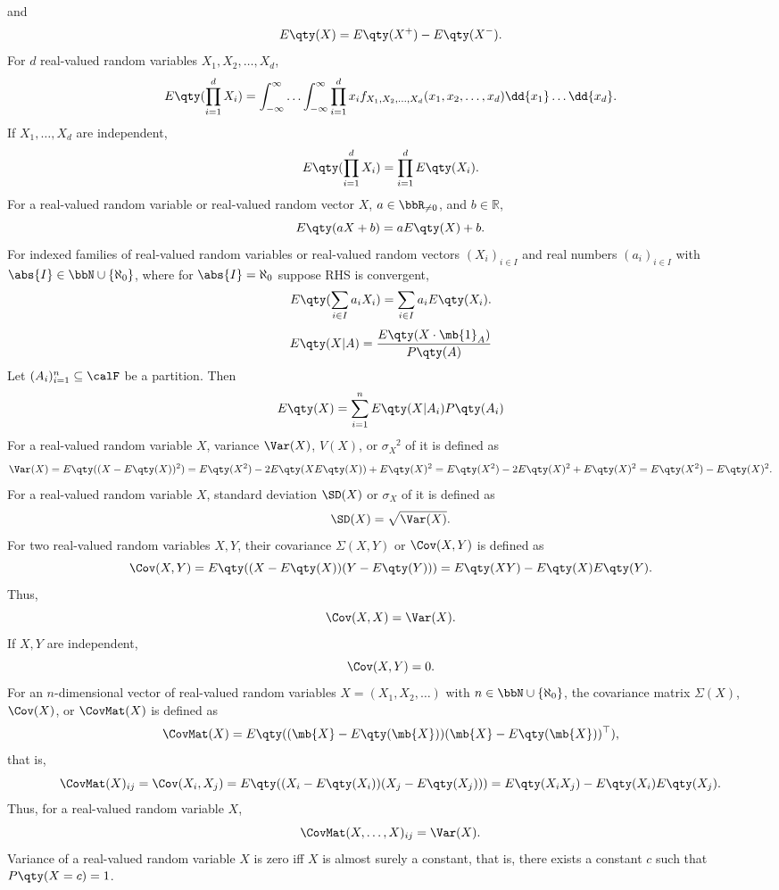\documentclass[a4paper,12pt]{report}
\begin{document}
\epr
and
\[E\qty(X)=E\qty(X^+)-E\qty(X^-).\]
For $d$ real-valued random variables $X_1,X_2,\ldots,X_d$,
\[E\qty(\prod_{i=1}^dX_i)=\int_{-\infty}^{\infty}\ldots\int_{-\infty}^{\infty}\prod_{i=1}^dx_if_{X_1,X_2,\ldots,X_d}(x_1,x_2,\ldots,x_d)\dd{x_1}\ldots\dd{x_d}.\]
If $X_1,\ldots,X_d$ are independent,
\[E\qty(\prod_{i=1}^dX_i)=\prod_{i=1}^dE\qty(X_i).\]
For a real-valued random variable or real-valued random vector $X$, $a\in\bbR_{\neq0}$, and $b\in\mathbb{R}$,
\[E\qty(aX+b)=aE\qty(X)+b.\]
For indexed families of real-valued random variables or real-valued random vectors $(X_i)_{i\in I}$ and real numbers $(a_i)_{i\in I}$ with $\abs{I}\in\bbN\cup\{\aleph_0\}$, where for $\abs{I}=\aleph_0$ suppose RHS is convergent,
\[E\qty(\sum_{i\in I}a_iX_i)=\sum_{i\in I}a_iE\qty(X_i).\]
\[E\qty(X|A)=\frac{E\qty(X\cdot\mb{1}_A)}{P\qty(A)}\]
Let $(A_i)_{i=1}^n\subseteq\calF$ be a partition. Then
\[E\qty(X)=\sum_{i=1}^nE\qty(X|A_i)P\qty(A_i)\]
For a real-valued random variable $X$, variance $\Var(X)$, $V(X)$, or $\sigma_X^{\phantom{X}2}$ of it is defined as
\[\Var(X)=E\qty((X-E\qty(X))^2)=E\qty(X^2)-2E\qty(XE\qty(X))+E\qty(X)^2=E\qty(X^2)-2E\qty(X)^2+E\qty(X)^2=E\qty(X^2)-E\qty(X)^2.\]
For a real-valued random variable $X$, standard deviation $\SD(X)$ or $\sigma_X$ of it is defined as
\[\SD(X)=\sqrt{\Var(X)}.\]
For two real-valued random variables $X,Y$, their covariance $\Sigma(X,Y)$ or $\Cov(X,Y)$ is defined as
\[\Cov(X,Y)=E\qty((X-E\qty(X))(Y-E\qty(Y)))=E\qty(XY)-E\qty(X)E\qty(Y).\]
Thus,
\[\Cov(X,X)=\Var(X).\]
If $X,Y$ are independent,
\[\Cov(X,Y)=0.\]
For an $n$-dimensional vector of real-valued random variables $X=(X_1,X_2,\ldots)$ with $n\in\bbN\cup\{\aleph_0\}$, the covariance matrix $\Sigma(X)$, $\Cov(X)$, or $\CovMat(X)$ is defined as
\[\CovMat(X)=E\qty((\mb{X}-E\qty(\mb{X}))(\mb{X}-E\qty(\mb{X}))^{\top}),\]
that is,
\[\CovMat(X)_{ij}=\Cov(X_i,X_j)=E\qty((X_i-E\qty(X_i))(X_j-E\qty(X_j)))=E\qty(X_iX_j)-E\qty(X_i)E\qty(X_j).\]
Thus, for a real-valued random variable $X$,
\[\CovMat(X,\ldots,X)_{ij}=\Var(X).\]
Variance of a real-valued random variable $X$ is zero iff $X$ is almost surely a constant, that is, there exists a constant $c$ such that $P\qty(X=c)=1$.
\end{document}
